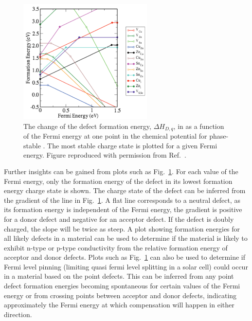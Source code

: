 \documentclass[11pt, twoside]{report}
\begin{document}
\begin{figure}[h!]
    \centering
    \includegraphics[width=0.6\textwidth]{figures/Chen_defects_map.png}
    \caption[The change of the defect formation energy, $\Delta H_{D, q}$,in {\CZTS} as a  function of the Fermi energy at one point in the chemical potential space for phase-stable {\CZTS}. The most stable charge state is plotted for a given Fermi energy.]{The change of the defect formation energy, $\Delta H_{D, q}$, in {\CZTS} as a  function of the Fermi energy at one point in the chemical potential for phase-stable {\CZTS}. The most stable charge state is plotted for a given Fermi energy. Figure reproduced with permission from Ref.~.}
    \label{Chen_defects_map}
\end{figure}

Further insights can be gained from plots such as Fig.~\ref{Chen_defects_map}. For each value of the Fermi energy, only the formation energy of the defect in its lowest formation energy charge state is shown. The charge state of the defect can be inferred from the gradient of the line in Fig.~\ref{Chen_defects_map}. A flat line corresponds to a neutral defect, as its formation energy is independent of the Fermi energy, the gradient is positive for a donor defect and negative for an acceptor defect. If the defect is doubly charged, the slope will be twice as steep. A plot showing formation energies for all likely defects in a material can be used to determine if the material is likely to exhibit n-type or p-type conductivity from the relative formation energy of acceptor and donor defects. Plots such as Fig.~\ref{Chen_defects_map} can also be used to determine if Fermi level pinning (limiting quasi fermi level splitting in a solar cell) could occur in a material based on the point defects. This can be inferred from any point defect formation energies becoming spontaneous for certain values of the Fermi energy or from crossing points between acceptor and donor defects, indicating approximately the Fermi energy at which compensation will happen in either direction.
\end{document}
